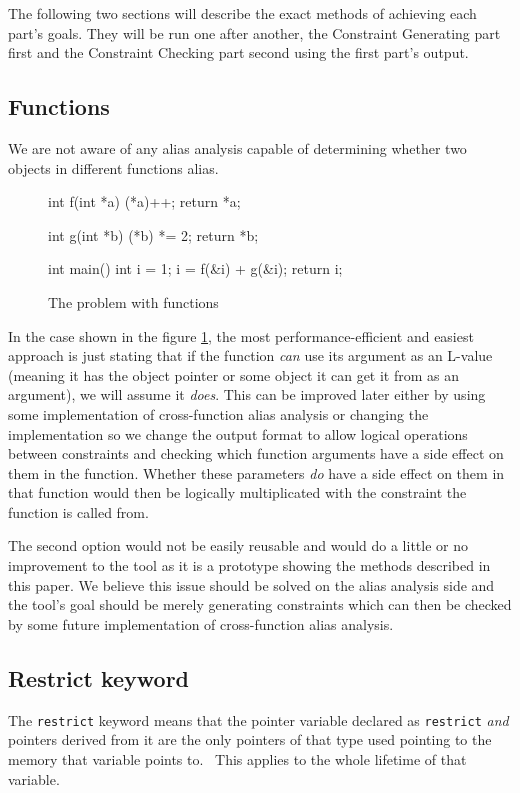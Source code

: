 The following two sections will describe the exact methods of achieving each part's goals. They will be run one after another, the Constraint Generating part first and the Constraint Checking part second using the first part's output.


\subsection{Functions}\label{functions}
We are not aware of any alias analysis capable of determining whether two objects in different functions alias.

\begin{figure}
\caption{The problem with functions}
\label{functions-source}
\begin{code}
int f(int *a){
    (*a)++;
    return *a;
}

int g(int *b){
    (*b) *= 2;
    return *b;
}

int main(){
    int i = 1;
    i = f(&i) + g(&i);
    return i;
}
\end{code}
\end{figure}

In the case shown in the figure \ref{functions-source}, the most performance-efficient and easiest approach is just stating that if the function \emph{can} use its argument as an L-value (meaning it has the object pointer or some object it can get it from as an argument), we will assume it \emph{does}. This can be improved later either by using some implementation of cross-function alias analysis or changing the implementation so we change the output format to allow logical operations between constraints and checking which function arguments have a side effect on them in the function. Whether these parameters \emph{do} have a side effect on them in that function would then be logically multiplicated with the constraint the function is called from.

The second option would not be easily reusable and would do a little or no improvement to the tool as it is a prototype showing the methods described in this paper. We believe this issue should be solved on the alias analysis side and the tool's goal should be merely generating constraints which can then be checked by some future implementation of cross-function alias analysis.

\subsection{Restrict keyword}
The \verb|restrict| keyword means that the pointer variable declared as \verb|restrict| \emph{and} pointers derived from it are the only pointers of that type used pointing to the memory that variable points to.~\cite{WG14N1570} This applies to the whole lifetime of that variable.

